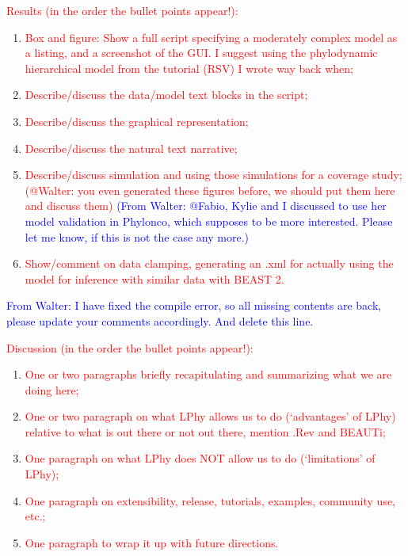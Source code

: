 \documentclass[10pt,letterpaper,table]{article}
\begin{document}
\textcolor{red}{Results (in the order the bullet points appear!):}
\begin{enumerate}
    \item \textcolor{red}{Box and figure: Show a full script specifying a moderately complex model as a listing, and a screenshot of the GUI. I suggest using the phylodynamic hierarchical model from the tutorial (RSV) I wrote way back when;}
    \item \textcolor{red}{Describe/discuss the data/model text blocks in the script;}
    \item \textcolor{red}{Describe/discuss the graphical representation;}
    \item \textcolor{red}{Describe/discuss the natural text narrative;}
    \item \textcolor{red}{Describe/discuss simulation and using those simulations for a coverage study; (@Walter: you even generated these figures before, we should put them here and discuss them)} \textcolor{blue}{(From Walter: @Fabio, Kylie and I discussed to use her model validation in Phylonco, which supposes to be more interested. Please let me know, if this is not the case any more.)}
    \item \textcolor{red}{Show/comment on data clamping, generating an .xml for actually using the model for inference with similar data with BEAST 2.}
    \newline
\end{enumerate}

\textcolor{blue}{From Walter: I have fixed the compile error, so all missing contents are back, please update your comments accordingly. And delete this line.}

\textcolor{red}{Discussion (in the order the bullet points appear!):}
\begin{enumerate}
    \item \textcolor{red}{One or two paragraphs briefly recapitulating and summarizing what we are doing here;}
    \item \textcolor{red}{One or two paragraph on what LPhy allows us to do (`advantages' of LPhy) relative to what is out there or not out there, mention .Rev and BEAUTi;}
    \item \textcolor{red}{One paragraph on what LPhy does NOT allow us to do (`limitations' of LPhy);}
    \item \textcolor{red}{One paragraph on extensibility, release, tutorials, examples, community use, etc.;}
    \item \textcolor{red}{One paragraph to wrap it up with future directions.}
    \newline
\end{enumerate}
\end{document}
